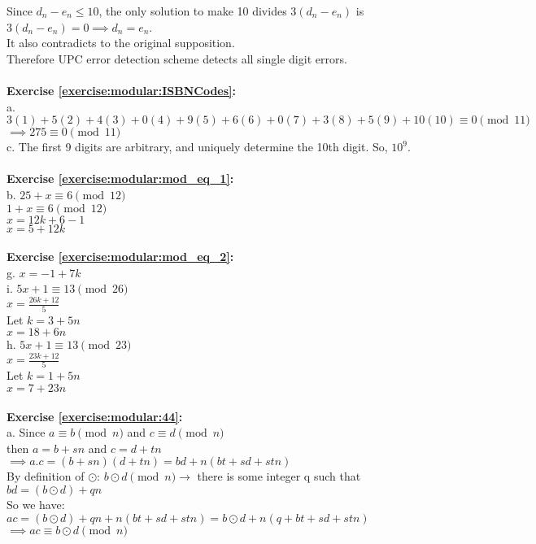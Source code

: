 Since $d_n-e_n \le 10$, the only solution to make 10 divides $3(d_n-e_n)$ is $3(d_n-e_n)=0 \implies d_n=e_n$.\\
It also contradicts to the original supposition.\\
Therefore UPC error detection scheme detects all single digit errors.\\
\\
\textbf{Exercise \ref{exercise:modular:ISBNCodes}:}\\
a. $3(1)+5(2)+4(3)+0(4)+9(5)+6(6)+0(7)+3(8)+5(9)+10(10) \equiv 0 \pmod{11}$\\
$\implies 275 \equiv 0 \pmod{11}$\\
c. The first 9 digits are arbitrary, and uniquely determine the 10th digit. So, $10^9$.\\
\\
\textbf{Exercise \ref{exercise:modular:mod_eq_1}:}\\
b. $25+x \equiv 6 \pmod{12}$\\
$1+x \equiv 6 \pmod{12}$\\
$x= 12k+6-1$\\
$x=5+12k$\\
\\
\textbf{Exercise \ref{exercise:modular:mod_eq_2}:}\\
g. $x=-1+7k$\\
i. $5x+1 \equiv 13 \pmod{26}$\\
$x= \displaystyle\frac{26k+12}{5}$\\
Let $k=3+5n$\\
$x=18+6n$\\
h. $5x+1 \equiv 13 \pmod{23}$\\
$x= \displaystyle\frac{23k+12}{5}$\\
Let $k=1+5n$\\
$x=7+23n$\\
\\
\textbf{Exercise \ref{exercise:modular:44}:}\\
a. Since $a \equiv b \pmod{n}$ and $c \equiv d \pmod{n}$\\
then $a=b+sn$ and $c=d+tn$\\
$\implies a.c =(b+sn)(d+tn)=bd+n(bt+sd+stn)$\\
By definition of $\odot$: $b \odot d \pmod{n} \to$ there is some integer q such that $bd=(b \odot d) +qn$\\
So we have: $ac=(b \odot d)+qn+n(bt+sd+stn)=b \odot d + n(q+bt+sd+stn)$\\
$\implies ac \equiv b \odot d \pmod{n}$\\

